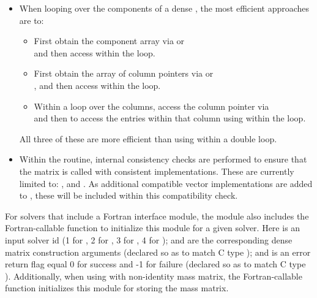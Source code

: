 \begin{itemize}
                                        
\item
  When looping over the components of a dense  ,
  the most efficient approaches are to:
  \begin{itemize}
    \item First obtain the component array via  or\\
     and then
    access  within the loop.
  
    \item First obtain the array of column pointers via  or\\
    , and then
    access  within the loop. 
  
    \item Within a loop over the columns, access the column pointer via\\
     and then to access the
    entries within that column using  within the loop.
  \end{itemize}
  All three of these are more efficient than
  using  within a double loop.

\item
  {\warn} Within the  routine, internal
  consistency checks are performed to ensure that the matrix is called
  with consistent {\nvector} implementations.  These are currently
  limited to: {\nvecs}, {\nvecopenmp} and {\nvecpthreads}.  As additional
  compatible vector implementations are added to {\sundials}, these
  will be included within this compatibility check.

\end{itemize}

For solvers that include a Fortran interface module, the {\sunmatdense}
module also includes the Fortran-callable
function  to initialize
this {\sunmatdense} module for a given {\sundials} solver.
Here  is an input solver id (1 for {\cvode}, 2 for {\ida}, 3
for {\kinsol}, 4 for {\arkode});  and  are the
corresponding dense matrix construction arguments (declared so as to
match C type ); and  is an error return flag 
equal 0 for success and -1 for failure (declared so as to match C type
). Additionally, when using {\arkode} with non-identity mass
matrix, the Fortran-callable function  
initializes this {\sunmatdense} module for storing the mass matrix.
